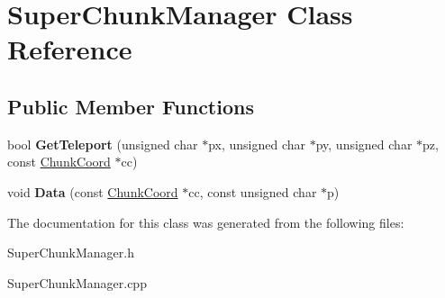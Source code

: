 \hypertarget{classSuperChunkManager}{\section{\-Super\-Chunk\-Manager \-Class \-Reference}
\label{classSuperChunkManager}
}
\subsection*{\-Public \-Member \-Functions}
\begin{DoxyCompactItemize}
\item 
\hypertarget{classSuperChunkManager_a63750019d96a2d6ce202e19604914a69}{bool {\bfseries \-Get\-Teleport} (unsigned char $\ast$px, unsigned char $\ast$py, unsigned char $\ast$pz, const \hyperlink{structChunkCoord}{\-Chunk\-Coord} $\ast$cc)}\label{classSuperChunkManager_a63750019d96a2d6ce202e19604914a69}

\item 
\hypertarget{classSuperChunkManager_a86babbfdea357e9e6cbdaf1028f13fa8}{void {\bfseries \-Data} (const \hyperlink{structChunkCoord}{\-Chunk\-Coord} $\ast$cc, const unsigned char $\ast$p)}\label{classSuperChunkManager_a86babbfdea357e9e6cbdaf1028f13fa8}

\end{DoxyCompactItemize}


\-The documentation for this class was generated from the following files\-:\begin{DoxyCompactItemize}
\item 
\-Super\-Chunk\-Manager.\-h\item 
\-Super\-Chunk\-Manager.\-cpp\end{DoxyCompactItemize}
